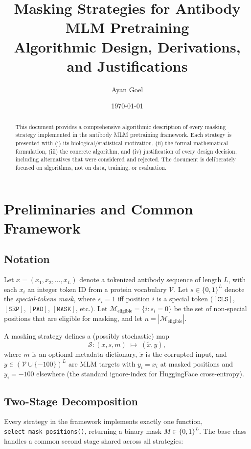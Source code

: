 \documentclass[11pt]{article}
\title{\textbf{Masking Strategies for Antibody MLM Pretraining} \\
\large Algorithmic Design, Derivations, and Justifications}
\author{Ayan Goel}
\date{\today}
\begin{document}
\maketitle

\begin{abstract}
This document provides a comprehensive algorithmic description of every
masking strategy implemented in the antibody MLM pretraining framework.
Each strategy is presented with (i) its biological/statistical motivation,
(ii) the formal mathematical formulation, (iii) the concrete algorithm,
and (iv) justification of every design decision, including alternatives
that were considered and rejected. The document is deliberately focused
on algorithms, not on data, training, or evaluation.
\end{abstract}

\tableofcontents
\vspace{1em}

\section{Preliminaries and Common Framework}

\subsection{Notation}
Let $x = (x_1, x_2, \dots, x_L)$ denote a tokenized antibody sequence of
length $L$, with each $x_i$ an integer token ID from a protein vocabulary
$\mathcal{V}$. Let $s \in \{0, 1\}^L$ denote the \emph{special-tokens mask},
where $s_i = 1$ iff position $i$ is a special token
($[\texttt{CLS}]$, $[\texttt{SEP}]$, $[\texttt{PAD}]$, $[\texttt{MASK}]$, etc.).
Let $\mathcal{M}_{\text{eligible}} = \{i : s_i = 0\}$ be the set of
non-special positions that are eligible for masking, and let
$n = |\mathcal{M}_{\text{eligible}}|$.

A masking strategy defines a (possibly stochastic) map
\[
\mathcal{S} : (x, s, m) \;\mapsto\; (\tilde x, y),
\]
where $m$ is an optional metadata dictionary, $\tilde x$ is the corrupted
input, and $y \in (\mathcal{V} \cup \{-100\})^L$ are MLM targets with
$y_i = x_i$ at masked positions and $y_i = -100$ elsewhere (the standard
ignore-index for HuggingFace cross-entropy).

\subsection{Two-Stage Decomposition}
Every strategy in the framework implements exactly one function,
\texttt{select\_mask\_positions()}, returning a binary mask
$M \in \{0,1\}^L$. The base class handles a common second stage shared
across all strategies:
\end{document}
